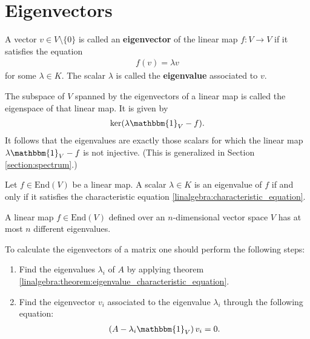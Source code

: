\section{Eigenvectors}

    \begin{definition}[Eigenvector]
        A vector $v\in V\setminus\{0\}$ is called an \textbf{eigenvector} of the linear map $f:V\rightarrow V$ if it satisfies the equation
       \begin{gather}
            f(v) = \lambda v
        \end{gather}
       for some $\lambda\in K$. The scalar $\lambda$ is called the \textbf{eigenvalue} associated to $v$.
    \end{definition}
    \begin{definition}[Eigenspace]\label{linalgebra:eigenvalue_remark}
        The subspace of $V$ spanned by the eigenvectors of a linear map is called the eigenspace of that linear map. It is given by
        \begin{gather}
            \text{ker}(\lambda\mathbbm{1}_V - f).
        \end{gather}
        It follows that the eigenvalues are exactly those scalars for which the linear map $\lambda\mathbbm{1}_V-f$ is not injective. (This is generalized in Section \ref{section:spectrum}.)
    \end{definition}

    \begin{theorem}\label{linalgebra:theorem:eigenvalue_characteristic_equation}
        Let $f\in\mathrm{End}(V)$ be a linear map. A scalar $\lambda\in K$ is an eigenvalue of $f$ if and only if it satisfies the characteristic equation \ref{linalgebra:characteristic_equation}.
    \end{theorem}

    \begin{theorem}
        A linear map $f\in\mathrm{End}(V)$ defined over an $n$-dimensional vector space $V$ has at most $n$ different eigenvalues.
    \end{theorem}

    \begin{method}
        To calculate the eigenvectors of a matrix one should perform the following steps:
        \begin{enumerate}
            \item Find the eigenvalues $\lambda_i$ of $A$ by applying theorem \ref{linalgebra:theorem:eigenvalue_characteristic_equation}.
            \item Find the eigenvector $v_i$ associated to the eigenvalue $\lambda_i$ through the following equation:
                \begin{gather}
                    \label{linalgebra:eigenvectors:eigenspace}
                    \left(A - \lambda_i\mathbbm{1}_V\right)v_i = 0.
                \end{gather}
        \end{enumerate}
    \end{method}

